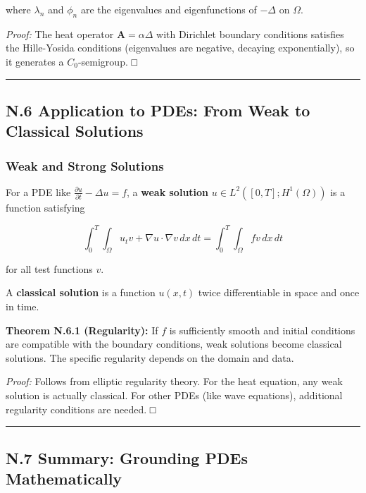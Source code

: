 \documentclass[
]{article}
\begin{document}
where \(\lambda_n\) and \(\phi_n\) are the eigenvalues and
eigenfunctions of \(-\Delta\) on \(\Omega\).

\emph{Proof:} The heat operator \(\mathbf{A} = \alpha\Delta\) with
Dirichlet boundary conditions satisfies the Hille-Yosida conditions
(eigenvalues are negative, decaying exponentially), so it generates a
\(C_0\)-semigroup. □

\begin{center}\rule{0.5\linewidth}{0.5pt}\end{center}

\subsection{N.6 Application to PDEs: From Weak to Classical
Solutions}\label{n.6-application-to-pdes-from-weak-to-classical-solutions}

\subsubsection{Weak and Strong
Solutions}\label{weak-and-strong-solutions}

For a PDE like \(\frac{\partial u}{\partial t} - \Delta u = f\), a
\textbf{weak solution} \(u \in L^2([0,T]; H^1(\Omega))\) is a function
satisfying

\[\int_0^T \int_\Omega u_t v + \nabla u \cdot \nabla v\,dx\,dt = \int_0^T \int_\Omega fv\,dx\,dt\]

for all test functions \(v\).

A \textbf{classical solution} is a function \(u(x,t)\) twice
differentiable in space and once in time.

\textbf{Theorem N.6.1 (Regularity):} If \(f\) is sufficiently smooth and
initial conditions are compatible with the boundary conditions, weak
solutions become classical solutions. The specific regularity depends on
the domain and data.

\emph{Proof:} Follows from elliptic regularity theory. For the heat
equation, any weak solution is actually classical. For other PDEs (like
wave equations), additional regularity conditions are needed. □

\begin{center}\rule{0.5\linewidth}{0.5pt}\end{center}

\subsection{N.7 Summary: Grounding PDEs
Mathematically}\label{n.7-summary-grounding-pdes-mathematically}
\end{document}
